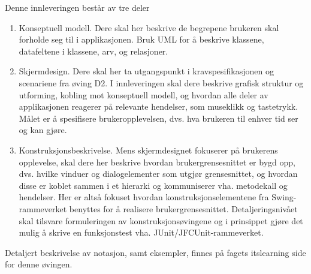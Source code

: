 Denne innleveringen består av tre deler

\begin{enumerate}

\item
Konseptuell modell. Dere skal her beskrive de begrepene brukeren skal forholde seg til i applikasjonen. Bruk UML for å beskrive klassene, datafeltene i klassene, arv, og relasjoner.

\item
Skjermdesign. Dere skal her ta utgangspunkt i kravspesifikasjonen og scenariene fra øving D2. I innleveringen skal dere beskrive grafisk struktur og utforming, kobling mot konseptuell modell, og hvordan alle deler av applikasjonen reagerer på relevante hendelser, som museklikk og tastetrykk. Målet er å spesifisere brukeropplevelsen, dvs. hva brukeren til enhver tid ser og kan gjøre.

\item
Konstruksjonsbeskrivelse. Mens skjermdesignet fokuserer på brukerens opplevelse, skal dere her beskrive hvordan brukergrensesnittet er bygd opp, dvs. hvilke vinduer og dialogelementer som utgjør grensesnittet, og hvordan disse er koblet sammen i et hierarki og kommuniserer vha. metodekall og hendelser. Her er altså fokuset hvordan konstruksjonselementene fra Swing-rammeverket benyttes for å realisere brukergrensesnittet. Detaljeringsnivået skal tilsvare formuleringen av konstruksjonsøvingene og i prinsippet gjøre det mulig å skrive en funksjonstest vha. JUnit/JFCUnit-rammeverket.

\end{enumerate}

Detaljert beskrivelse av notasjon, samt eksempler, finnes på fagets itslearning side for denne øvingen.
